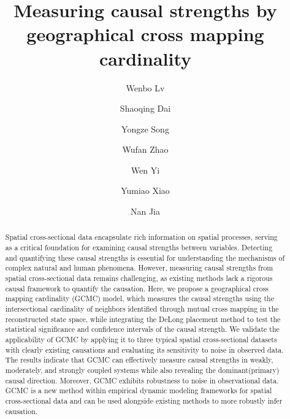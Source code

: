 \documentclass[authoryear,preprint,review,12pt]{elsarticle}
\begin{document}
\begin{frontmatter}
\title{Measuring causal strengths by geographical cross mapping cardinality}

\author[a,b,c]{Wenbo Lv}

\author[d]{Shaoqing Dai}

\author[e]{Yongze Song}

\author[a]{Wufan Zhao}

\author[b]{Wen Yi}

\author[a]{Yumiao Xiao}

\author[f,g]{Nan Jia}

\address[a]{Urban Governance and Design Thrust, Society Hub, The Hong Kong University of Science and Technology(Guangzhou), Guangzhou, China}
\address[b]{Department of Building and Real Estate, The Hong Kong Polytechnic University, Hong Kong, China}
\address[c]{The Hong Kong Polytechnic University, Shenzhen Research Institute, Shenzhen, China}
\address[d]{School of Resource and Environmental Sciences, Wuhan University, Wuhan, China}
\address[e]{School of Design and the Built Environment, Curtin University, Perth, Australia}
\address[f]{Department of Fisheries and Wildlife, Michigan State University, East Lansing, USA}
\address[g]{School of Design, Shanghai Jiao Tong Univeristy, Shanghai, China}


\begin{abstract}


Spatial cross-sectional data encapsulate rich information on spatial processes, serving as a critical foundation for examining causal strengths between variables. Detecting and quantifying these causal strengths is essential for understanding the mechanisms of complex natural and human phenomena. However, measuring causal strengths from spatial cross-sectional data remains challenging, as existing methods lack a rigorous causal framework to quantify the causation. Here, we propose a geographical cross mapping cardinality (GCMC) model, which measures the causal strengths using the intersectional cardinality of neighbors identified through mutual cross mapping in the reconstructed state space, while integrating the DeLong placement method to test the statistical significance and confidence intervals of the causal strength. We validate the applicability of GCMC by applying it to three typical spatial cross-sectional datasets with clearly existing causations and evaluating its sensitivity to noise in observed data. The results indicate that GCMC can effectively measure causal strengths in weakly, moderately, and strongly coupled systems while also revealing the dominant(primary) causal direction. Moreover, GCMC exhibits robustness to noise in observational data. GCMC is a new method within empirical dynamic modeling frameworks for spatial cross-sectional data and can be used alongside existing methods to more robustly infer causation.



\end{abstract}
\end{frontmatter}
\end{document}
